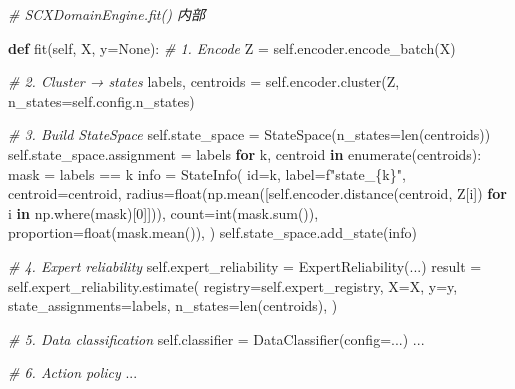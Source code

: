 \documentclass[
  12pt,
]{ctexart}
\newenvironment{Shaded}{}{}
\newcommand{\BuiltInTok}[1]{\textcolor[rgb]{0.00,0.50,0.00}{#1}}
\newcommand{\CommentTok}[1]{\textcolor[rgb]{0.38,0.63,0.69}{\textit{#1}}}
\newcommand{\ControlFlowTok}[1]{\textcolor[rgb]{0.00,0.44,0.13}{\textbf{#1}}}
\newcommand{\DecValTok}[1]{\textcolor[rgb]{0.25,0.63,0.44}{#1}}
\newcommand{\KeywordTok}[1]{\textcolor[rgb]{0.00,0.44,0.13}{\textbf{#1}}}
\newcommand{\NormalTok}[1]{#1}
\newcommand{\OperatorTok}[1]{\textcolor[rgb]{0.40,0.40,0.40}{#1}}
\newcommand{\SpecialCharTok}[1]{\textcolor[rgb]{0.25,0.44,0.63}{#1}}
\newcommand{\SpecialStringTok}[1]{\textcolor[rgb]{0.73,0.40,0.53}{#1}}
\newcommand{\VariableTok}[1]{\textcolor[rgb]{0.10,0.09,0.49}{#1}}
\begin{document}
\begin{Shaded}
\begin{Highlighting}[]
\CommentTok{\# SCXDomainEngine.fit() 内部}

\KeywordTok{def}\NormalTok{ fit(}\VariableTok{self}\NormalTok{, X, y}\OperatorTok{=}\VariableTok{None}\NormalTok{):}
    \CommentTok{\# 1. Encode}
\NormalTok{    Z }\OperatorTok{=} \VariableTok{self}\NormalTok{.encoder.encode\_batch(X)}

    \CommentTok{\# 2. Cluster → states}
\NormalTok{    labels, centroids }\OperatorTok{=} \VariableTok{self}\NormalTok{.encoder.cluster(Z, n\_states}\OperatorTok{=}\VariableTok{self}\NormalTok{.config.n\_states)}

    \CommentTok{\# 3. Build StateSpace}
    \VariableTok{self}\NormalTok{.state\_space }\OperatorTok{=}\NormalTok{ StateSpace(n\_states}\OperatorTok{=}\BuiltInTok{len}\NormalTok{(centroids))}
    \VariableTok{self}\NormalTok{.state\_space.assignment }\OperatorTok{=}\NormalTok{ labels}
    \ControlFlowTok{for}\NormalTok{ k, centroid }\KeywordTok{in} \BuiltInTok{enumerate}\NormalTok{(centroids):}
\NormalTok{        mask }\OperatorTok{=}\NormalTok{ labels }\OperatorTok{==}\NormalTok{ k}
\NormalTok{        info }\OperatorTok{=}\NormalTok{ StateInfo(}
            \BuiltInTok{id}\OperatorTok{=}\NormalTok{k,}
\NormalTok{            label}\OperatorTok{=}\SpecialStringTok{f"state\_}\SpecialCharTok{\{}\NormalTok{k}\SpecialCharTok{\}}\SpecialStringTok{"}\NormalTok{,}
\NormalTok{            centroid}\OperatorTok{=}\NormalTok{centroid,}
\NormalTok{            radius}\OperatorTok{=}\BuiltInTok{float}\NormalTok{(np.mean([}\VariableTok{self}\NormalTok{.encoder.distance(centroid, Z[i])}
                                  \ControlFlowTok{for}\NormalTok{ i }\KeywordTok{in}\NormalTok{ np.where(mask)[}\DecValTok{0}\NormalTok{]])),}
\NormalTok{            count}\OperatorTok{=}\BuiltInTok{int}\NormalTok{(mask.}\BuiltInTok{sum}\NormalTok{()),}
\NormalTok{            proportion}\OperatorTok{=}\BuiltInTok{float}\NormalTok{(mask.mean()),}
\NormalTok{        )}
        \VariableTok{self}\NormalTok{.state\_space.add\_state(info)}

    \CommentTok{\# 4. Expert reliability}
    \VariableTok{self}\NormalTok{.expert\_reliability }\OperatorTok{=}\NormalTok{ ExpertReliability(...)}
\NormalTok{    result }\OperatorTok{=} \VariableTok{self}\NormalTok{.expert\_reliability.estimate(}
\NormalTok{        registry}\OperatorTok{=}\VariableTok{self}\NormalTok{.expert\_registry,}
\NormalTok{        X}\OperatorTok{=}\NormalTok{X, y}\OperatorTok{=}\NormalTok{y,}
\NormalTok{        state\_assignments}\OperatorTok{=}\NormalTok{labels,}
\NormalTok{        n\_states}\OperatorTok{=}\BuiltInTok{len}\NormalTok{(centroids),}
\NormalTok{    )}

    \CommentTok{\# 5. Data classification}
    \VariableTok{self}\NormalTok{.classifier }\OperatorTok{=}\NormalTok{ DataClassifier(config}\OperatorTok{=}\NormalTok{...)}
\NormalTok{    ...}

    \CommentTok{\# 6. Action policy}
\NormalTok{    ...}
\end{Highlighting}
\end{Shaded}
\end{document}
